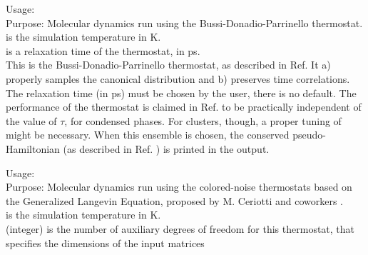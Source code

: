 { \noindent
  Usage:   
    \\[1.0ex]
  Purpose: Molecular dynamics run using the Bussi-Donadio-Parrinello
    thermostat. \cite{BDP}\\[1.0ex]
   is the simulation temperature in K. \\
   is a relaxation time of the thermostat, in ps. \\
}
This is the Bussi-Donadio-Parrinello thermostat, as described in Ref. \cite{BDP}
It a) properly samples the canonical distribution and b)
preserves time correlations. The relaxation time  (in ps) must be chosen
by the user, there is no default. The performance of the thermostat is claimed in 
Ref. \cite{BDP} to be practically independent of the value of $\tau$, for condensed phases.
For clusters, though, a proper tuning of  might be necessary.
When this ensemble is chosen, the conserved pseudo-Hamiltonian (as described 
in Ref. \cite{BDP}) is printed in the output.


{ \noindent
  Usage:   
   \\[1.0ex]
  Purpose: Molecular dynamics run using the colored-noise thermostats
           based on the Generalized Langevin Equation, proposed by
           M. Ceriotti and coworkers \cite{GLE1, GLE2, GLE3}. \\[1.0ex]
   is the simulation temperature in K. \\ [1.0ex]
   (integer) is the number of auxiliary degrees of freedom for this thermostat, that specifies the dimensions of the input matrices 
  \\[1.0em]
} 

